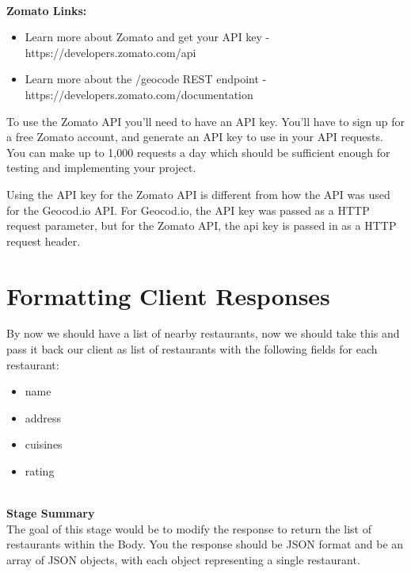 \documentclass{article}
\begin{document}
\-\ \\
\textbf{Zomato Links:}
\begin{itemize}
\item  Learn more about Zomato and get your API key - https://developers.zomato.com/api
\item Learn more about the /geocode REST endpoint - https://developers.zomato.com/documentation
\end{itemize}

\begin{info}
To use the Zomato API you'll need to have an API key. You'll have to sign up for a free Zomato account, and generate an API key to use in your API requests. You can make up to 1,000 requests a day which should be sufficient enough for testing and implementing your project. 
\end{info}

\begin{info}
Using the API key for the Zomato API is different from how the API was used for the Geocod.io API. For Geocod.io, the API key was passed as a HTTP request parameter, but for the Zomato API, the api key is passed in as a HTTP request header. 
\end{info}





\section{Formatting Client Responses}
By now we should have a list of nearby restaurants, now we should take this and pass it back our client as list of restaurants with the following fields for each restaurant:
\begin{itemize}
\item name
\item address
\item cuisines
\item rating
\end{itemize}

\-\ \\
\textbf{Stage Summary}\\
The goal of this stage would be to modify the response to return the list of restaurants within the Body. You the response should be JSON format and be an array of JSON objects, with each object representing a single restaurant. 
\end{document}
